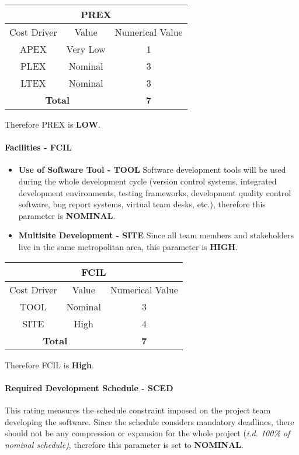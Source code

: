 \begin{longtable}{ccc}
\multicolumn{3}{c}{\textbf{PREX}}\\
\toprule
Cost Driver&Value&Numerical Value\\
\midrule
APEX&Very Low&1\\
PLEX&Nominal&3\\
LTEX&Nominal&3\\
\midrule
\multicolumn{2}{c}{\textbf{Total}}&\textbf{7}\\
\bottomrule
\end{longtable}

Therefore PREX is \textbf{LOW}.

\paragraph{Facilities - FCIL}
\begin{itemize}
	\item \textbf{Use of Software Tool - TOOL} Software development tools will be used during the whole development cycle (version control systems, integrated development environments, testing frameworks, development quality control software, bug report systems, virtual team desks, etc.), therefore this parameter is \textbf{NOMINAL}.
	\item \textbf{Multisite Development - SITE} Since all team members and stakeholders live in the same metropolitan area, this parameter is \textbf{HIGH}.
\end{itemize}

\begin{longtable}{ccc}
\multicolumn{3}{c}{\textbf{FCIL}}\\
\toprule
Cost Driver&Value&Numerical Value\\
\midrule
TOOL&Nominal&3\\
SITE&High&4\\
\midrule
\multicolumn{2}{c}{\textbf{Total}}&\textbf{7}\\
\bottomrule
\end{longtable}

Therefore FCIL is \textbf{High}.

\paragraph{Required Development Schedule - SCED}\label{par:sced}
This rating measures the schedule constraint imposed on the project team developing the software. Since the schedule considers mandatory deadlines, there should not be any compression or expansion for the whole project (\emph{i.d. 100\% of nominal schedule)}, therefore this parameter is set to \textbf{NOMINAL}.

